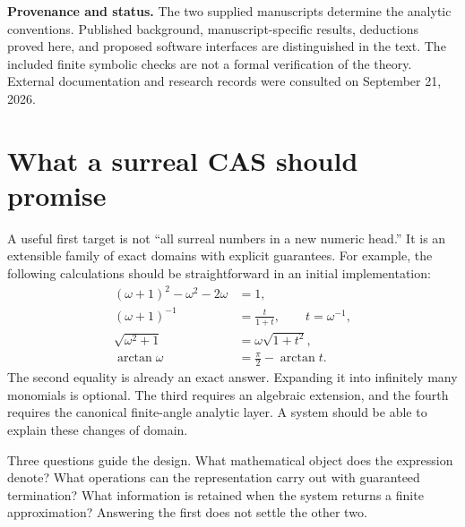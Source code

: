 \documentclass[11pt,letterpaper]{article}
\theoremstyle{definition}
\numberwithin{equation}{section}
\begin{document}
\begin{titlepage}
\begin{minipage}{0.94\textwidth}
\begin{abstract}
We prove elementary implementation-boundary results, including an undecidability obstruction for unrestricted computable coefficient streams and an obstruction to finite-list truncation in higher-rank value groups. Detailed algorithms, domain tables, worked examples, a staged implementation plan, and a small Wolfram Language reference kernel make the proposal concrete. The kernel implements only its advertised rational subfield; it is not a universal surreal CAS. No claim of complete symbolic normalization, unrestricted convergence, or a canonical infinite circular phase is made.
\end{abstract}
\end{minipage}
\vfill
\begin{minipage}{0.94\textwidth}\small
\textbf{Provenance and status.} The two supplied manuscripts determine the analytic conventions. Published background, manuscript-specific results, deductions proved here, and proposed software interfaces are distinguished in the text. The included finite symbolic checks are not a formal verification of the theory. External documentation and research records were consulted on September 21, 2026.
\end{minipage}
\end{titlepage}
\begingroup\footnotesize\setlength{\parskip}{0pt}\tableofcontents\endgroup
\clearpage

\section{What a surreal CAS should promise}\label{sec:goals}
A useful first target is not ``all surreal numbers in a new numeric head.'' It is an extensible family of exact domains with explicit guarantees. For example, the following calculations should be straightforward in an initial implementation:
\begin{align*}
 (\omega+1)^2-\omega^2-2\omega&=1,\\
 (\omega+1)^{-1}&=\frac{t}{1+t},\qquad t=\omega^{-1},\\
 \sqrt{\omega^2+1}&=\omega\sqrt{1+t^2},\\
 \arctan\omega&=\frac\pi2-\arctan t.
\end{align*}
The second equality is already an exact answer. Expanding it into infinitely many monomials is optional. The third requires an algebraic extension, and the fourth requires the canonical finite-angle analytic layer. A system should be able to explain these changes of domain.

Three questions guide the design. What mathematical object does the expression denote? What operations can the representation carry out with guaranteed termination? What information is retained when the system returns a finite approximation? Answering the first does not settle the other two.
\end{document}
